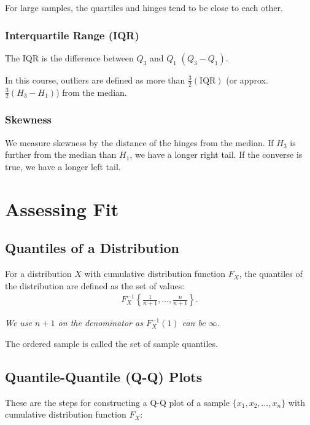 \documentclass[a4paper, 12pt, twoside]{article}
\begin{document}
For large samples, the quartiles and hinges tend to be close to each
other.

\subsubsection{Interquartile Range (IQR)}

The IQR is the difference between $Q_3$ and $Q_1$ $(Q_3 - Q_1)$.

In this course, outliers are defined as more than
$\frac{3}{2}(\text{IQR})$ (or approx. $\frac{3}{2}(H_3 - H_1)$) from the median.

\subsubsection{Skewness}

We measure skewness by the distance of the hinges from the median.
If $H_3$ is further from the median than $H_1$, we have a longer
right tail. If the converse is true, we have a longer left tail.

\section{Assessing Fit}

\subsection{Quantiles of a Distribution}

For a distribution $X$ with cumulative distribution function
$F_X$, the quantiles of the distribution are defined as the set
of values:
\begin{align*}
    F_X^{-1} \left\{ \frac{1}{n+1}, \ldots, \frac{n}{n+1} \right\}.
\end{align*}

\textit{We use $n + 1$ on the denominator as $F_X^{-1}(1)$ can be
$\infty$.}

\vspace{\baselineskip}

The ordered sample is called the set of sample quantiles.

\newpage

\subsection{Quantile-Quantile (Q-Q) Plots}

These are the steps for constructing a Q-Q plot of a sample
$\{x_1, x_2, \ldots, x_n\}$ with cumulative distribution function
$F_X$:
\end{document}
